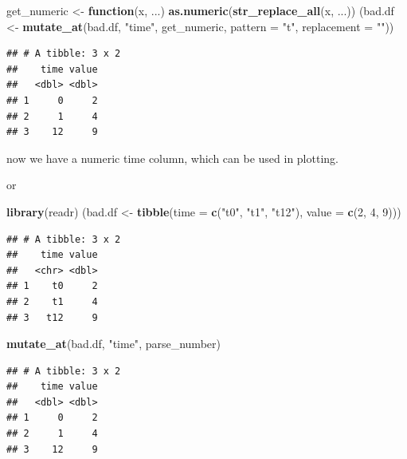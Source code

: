 \documentclass[]{book}
\newenvironment{Shaded}{\begin{snugshade}}{\end{snugshade}}
\newcommand{\KeywordTok}[1]{\textcolor[rgb]{0.13,0.29,0.53}{\textbf{#1}}}
\newcommand{\DataTypeTok}[1]{\textcolor[rgb]{0.13,0.29,0.53}{#1}}
\newcommand{\DecValTok}[1]{\textcolor[rgb]{0.00,0.00,0.81}{#1}}
\newcommand{\StringTok}[1]{\textcolor[rgb]{0.31,0.60,0.02}{#1}}
\newcommand{\ControlFlowTok}[1]{\textcolor[rgb]{0.13,0.29,0.53}{\textbf{#1}}}
\newcommand{\NormalTok}[1]{#1}
\begin{document}
\begin{Shaded}
\begin{Highlighting}[]
\NormalTok{get_numeric <-}\StringTok{ }\ControlFlowTok{function}\NormalTok{(x, ...) }\KeywordTok{as.numeric}\NormalTok{(}\KeywordTok{str_replace_all}\NormalTok{(x, ...))}
\NormalTok{(bad.df <-}\StringTok{ }\KeywordTok{mutate_at}\NormalTok{(bad.df, }\StringTok{"time"}\NormalTok{, get_numeric, }\DataTypeTok{pattern =} \StringTok{"t"}\NormalTok{, }\DataTypeTok{replacement =} \StringTok{""}\NormalTok{))}
\end{Highlighting}
\end{Shaded}

\begin{verbatim}
## # A tibble: 3 x 2
##    time value
##   <dbl> <dbl>
## 1     0     2
## 2     1     4
## 3    12     9
\end{verbatim}

now we have a numeric time column, which can be used in plotting.

or

\begin{Shaded}
\begin{Highlighting}[]
\KeywordTok{library}\NormalTok{(readr)}
\NormalTok{(bad.df <-}\StringTok{ }\KeywordTok{tibble}\NormalTok{(}\DataTypeTok{time =} \KeywordTok{c}\NormalTok{(}\StringTok{"t0"}\NormalTok{, }\StringTok{"t1"}\NormalTok{, }\StringTok{"t12"}\NormalTok{), }\DataTypeTok{value =} \KeywordTok{c}\NormalTok{(}\DecValTok{2}\NormalTok{, }\DecValTok{4}\NormalTok{, }\DecValTok{9}\NormalTok{)))}
\end{Highlighting}
\end{Shaded}

\begin{verbatim}
## # A tibble: 3 x 2
##    time value
##   <chr> <dbl>
## 1    t0     2
## 2    t1     4
## 3   t12     9
\end{verbatim}

\begin{Shaded}
\begin{Highlighting}[]
\KeywordTok{mutate_at}\NormalTok{(bad.df, }\StringTok{"time"}\NormalTok{, parse_number)}
\end{Highlighting}
\end{Shaded}

\begin{verbatim}
## # A tibble: 3 x 2
##    time value
##   <dbl> <dbl>
## 1     0     2
## 2     1     4
## 3    12     9
\end{verbatim}
\end{document}
